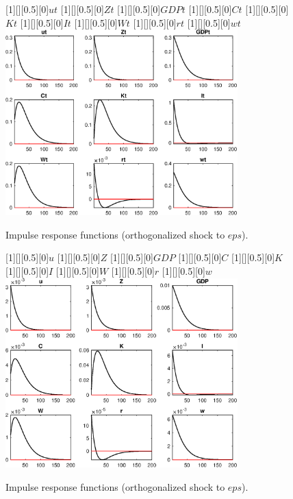  
\begin{figure}[H]
[1][][0.5][0]{$ut$}
[1][][0.5][0]{$Zt$}
[1][][0.5][0]{$GDPt$}
[1][][0.5][0]{$Ct$}
[1][][0.5][0]{$Kt$}
[1][][0.5][0]{$It$}
[1][][0.5][0]{$Wt$}
[1][][0.5][0]{$rt$}
[1][][0.5][0]{$wt$}
\centering 
\includegraphics[width=0.80\textwidth]{DyRa/graphs/DyRa_IRF_eps1}
\caption{Impulse response functions (orthogonalized shock to $eps$).}\label{Fig:IRF:eps:1}
\end{figure}
 
\begin{figure}[H]
[1][][0.5][0]{$u$}
[1][][0.5][0]{$Z$}
[1][][0.5][0]{$GDP$}
[1][][0.5][0]{$C$}
[1][][0.5][0]{$K$}
[1][][0.5][0]{$I$}
[1][][0.5][0]{$W$}
[1][][0.5][0]{$r$}
[1][][0.5][0]{$w$}
\centering 
\includegraphics[width=0.80\textwidth]{DyRa/graphs/DyRa_IRF_eps2}
\caption{Impulse response functions (orthogonalized shock to $eps$).}\label{Fig:IRF:eps:2}
\end{figure}
 
 
